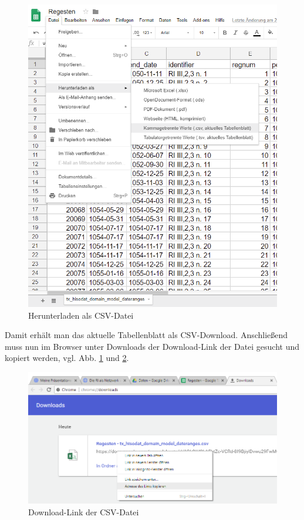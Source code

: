 \documentclass[ngerman,]{scrreprt}
\begin{document}
\begin{figure}
\centering
\includegraphics{Bilder/RI2Graph/google-docs-herunterladen-csv.png}
\caption{Herunterladen als CSV-Datei}
\label{herunterladen}
\end{figure}

Damit erhält man das aktuelle Tabellenblatt als CSV-Download. Anschließend muss nun im Browser unter Downloads der Download-Link der Datei gesucht und kopiert werden, vgl. Abb. \ref{herunterladen} und \ref{downloadlink}.

\begin{figure}
\centering
\includegraphics{Bilder/RI2Graph/google-docs-link-kopieren.png}
\caption{Download-Link der CSV-Datei} 
\label{downloadlink}
\end{figure}
\end{document}
